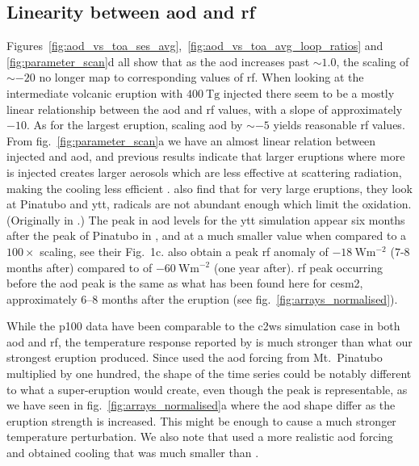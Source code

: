 \documentclass{ametsocV6.1}
\newcommand{\iso}[1][i]{{#1}njected \ce{SO2}}
\begin{document}
\subsection{Linearity between \gls{aod} and \gls{rf}}

Figures~\ref{fig:aod_vs_toa_ses_avg},~\ref{fig:aod_vs_toa_avg_loop_ratios} and
\ref{fig:parameter_scan}d all show that as the \gls{aod} increases past \(\sim 1.0\),
the scaling of \(\sim -20\) no longer map to corresponding values of \gls{rf}. When
looking at the intermediate volcanic eruption with \(\SI{400}{\tera\gram}\) \iso{} there
seem to be a mostly linear relationship between the \gls{aod} and \gls{rf} values, with
a slope of approximately \(-10\). As for the largest eruption, scaling \gls{aod} by
\(\sim-5\) yields reasonable \gls{rf} values. From fig.~\ref{fig:parameter_scan}a we
have an almost linear relation between \iso{} and \gls{aod}, and previous results
indicate that larger eruptions where more  is injected creates larger aerosols
which are less effective at scattering radiation, making the cooling less efficient
\citep{english2013,timmreck2010,timmreck2018}. \citet{timmreck2010} also find that for
very large eruptions, they look at Pinatubo and \gls{ytt},  radicals are not
abundant enough which limit the  oxidation. (Originally in \citep{bekki1995}.)
The peak in \gls{aod} levels for the \gls{ytt} simulation appear six months after the
peak of Pinatubo in \citet{timmreck2010}, and at a much smaller value when compared to a
\(100\times\) scaling, see their Fig.\ 1c. \citet{timmreck2010} also obtain a peak
\gls{rf} anomaly of \(\SI{-18}{\watt\metre^{-2}}\) (\(7\)-\(8\) months after) compared
to \citet{jones2005} of \(\SI{-60}{\watt\metre^{-2}}\) (one year after). \gls{rf} peak
occurring before the \gls{aod} peak is the same as what has been found here for
\gls{cesm2}, approximately \(6\)--\(8\) months after the eruption (see
fig.~\ref{fig:arrays_normalised}).

While the \gls{p100} data have been comparable to the \gls{c2ws} simulation case in both
\gls{aod} and \gls{rf}, the temperature response reported by \citet{jones2005} is much
stronger than what our strongest eruption produced. Since \citet{jones2005} used the
\gls{aod} forcing from Mt.\ Pinatubo multiplied by one hundred, the shape of the time
series could be notably different to what a super-eruption would create, even though the
peak is representable, as we have seen in fig.~\ref{fig:arrays_normalised}a where the
\gls{aod} shape differ as the eruption strength is increased. This might be enough to
cause a much stronger temperature perturbation. We also note that \citet{timmreck2010}
used a more realistic \gls{aod} forcing and obtained cooling that was much smaller than
\citet{jones2005}.
\end{document}
